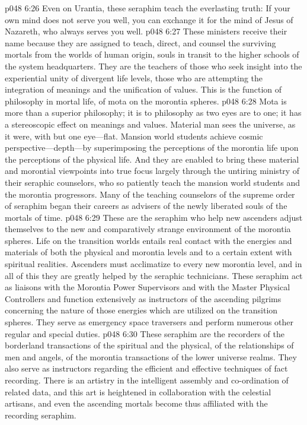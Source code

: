 \vs p048 6:26 Even on Urantia, these seraphim teach the everlasting truth: If your own mind does not serve you well, you can exchange it for the mind of Jesus of Nazareth, who always serves you well.
\pc \vs p048 6:27 \bibnobreakspace {} These ministers receive their name because they are assigned to teach, direct, and counsel the surviving mortals from the worlds of human origin, souls in transit to the higher schools of the system headquarters. They are the teachers of those who seek insight into the experiential unity of divergent life levels, those who are attempting the integration of meanings and the unification of values. This is the function of philosophy in mortal life, of mota on the morontia spheres.
\vs p048 6:28 Mota is more than a superior philosophy; it is to philosophy as two eyes are to one; it has a stereoscopic effect on meanings and values. Material man sees the universe, as it were, with but one eye---flat. Mansion world students achieve cosmic perspective---depth---by superimposing the perceptions of the morontia life upon the perceptions of the physical life. And they are enabled to bring these material and morontial viewpoints into true focus largely through the untiring ministry of their seraphic counselors, who so patiently teach the mansion world students and the morontia progressors. Many of the teaching counselors of the supreme order of seraphim began their careers as advisers of the newly liberated souls of the mortals of time.
\pc \vs p048 6:29 \bibnobreakspace {} These are the seraphim who help new ascenders adjust themselves to the new and comparatively strange environment of the morontia spheres. Life on the transition worlds entails real contact with the energies and materials of both the physical and morontia levels and to a certain extent with spiritual realities. Ascenders must acclimatize to every new morontia level, and in all of this they are greatly helped by the seraphic technicians. These seraphim act as liaisons with the Morontia Power Supervisors and with the Master Physical Controllers and function extensively as instructors of the ascending pilgrims concerning the nature of those energies which are utilized on the transition spheres. They serve as emergency space traversers and perform numerous other regular and special duties.
\pc \vs p048 6:30 \bibnobreakspace {} These seraphim are the recorders of the borderland transactions of the spiritual and the physical, of the relationships of men and angels, of the morontia transactions of the lower universe realms. They also serve as instructors regarding the efficient and effective techniques of fact recording. There is an artistry in the intelligent assembly and co\hyp{}ordination of related data, and this art is heightened in collaboration with the celestial artisans, and even the ascending mortals become thus affiliated with the recording seraphim.
